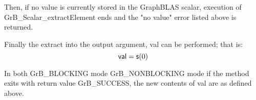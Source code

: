 Then, if no value is currently stored in the GraphBLAS scalar, execution of 
{\sf GrB\_Scalar\_extractElement} ends and the "no value" error listed above is returned.

Finally the extract into the output argument, {\sf val} can be performed;  
that is:
\[
    {\sf val} = {\sf s}(0)
\]

In both {\sf GrB\_BLOCKING} mode {\sf GrB\_NONBLOCKING} mode
if the method exits with return value {\sf GrB\_SUCCESS}, the  new 
contents of {\sf val} are as defined above.  


